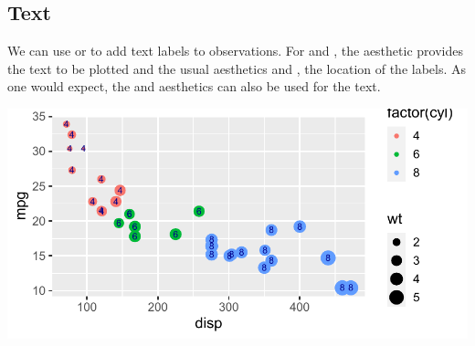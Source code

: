 \documentclass[krantz2]{krantz}\usepackage{knitr}
\begin{document}
\subsection{Text}\label{sec:plot:text}
We can use  or  to add text labels to observations. For  and , the aesthetic  provides the text to be plotted and the usual aesthetics  and , the location of the labels. As one would expect, the  and  aesthetics can also be used for the text.

\begin{knitrout}\footnotesize
{}\color{fgcolor}\begin{kframe}
\begin{alltt}
\hlstd{(}  \hlstd{(}   
                           \hlstd{=} 
                           
                            \hlopt{+}
  \hlstd{()} \hlopt{+}
  \hlstd{()} \hlopt{+}
  \hlstd{(} \hlstd{=} \hlstd{,}  \hlstd{=} \hlstd{)}
\end{alltt}
\end{kframe}

{\centering \includegraphics[width=.7\textwidth]{figure/pos-text-plot-01-1} 

}



\end{knitrout}
\end{document}
